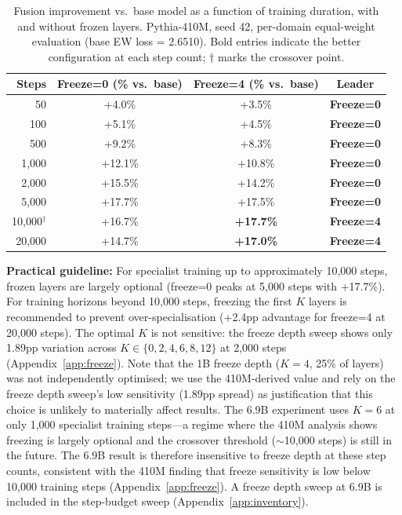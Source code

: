 \documentclass{article}
\begin{document}
\begin{table}[h]
\centering
\caption{Fusion improvement vs.\ base model as a function of training duration, with and without frozen layers. Pythia-410M, seed 42, per-domain equal-weight evaluation (base EW loss = 2.6510). Bold entries indicate the better configuration at each step count; $\dagger$ marks the crossover point.}
\label{tab:crossover}
\begin{tabular}{rccc}
\toprule
\textbf{Steps} & \textbf{Freeze=0} (\% vs.\ base) & \textbf{Freeze=4} (\% vs.\ base) & \textbf{Leader} \\
\midrule
50    & +4.0\%   & +3.5\%   & \textbf{Freeze=0} \\
100   & +5.1\%   & +4.5\%   & \textbf{Freeze=0} \\
500   & +9.2\%   & +8.3\%   & \textbf{Freeze=0} \\
1,000 & +12.1\%  & +10.8\%  & \textbf{Freeze=0} \\
2,000 & +15.5\%  & +14.2\%  & \textbf{Freeze=0} \\
5,000 & +17.7\%  & +17.5\%  & \textbf{Freeze=0} \\
10,000$^\dagger$ & +16.7\% & \textbf{+17.7\%} & \textbf{Freeze=4} \\
20,000 & +14.7\% & \textbf{+17.0\%} & \textbf{Freeze=4} \\
\bottomrule
\end{tabular}
\end{table}

\textbf{Practical guideline:} For specialist training up to approximately 10,000 steps, frozen layers are largely optional (freeze=0 peaks at 5,000 steps with +17.7\%). For training horizons beyond 10,000 steps, freezing the first $K$ layers is recommended to prevent over-specialisation (+2.4pp advantage for freeze=4 at 20,000 steps). The optimal $K$ is not sensitive: the freeze depth sweep shows only 1.89pp variation across $K \in \{0, 2, 4, 6, 8, 12\}$ at 2,000 steps (Appendix~\ref{app:freeze}). Note that the 1B freeze depth ($K=4$, 25\% of layers) was not independently optimised; we use the 410M-derived value and rely on the freeze depth sweep's low sensitivity (1.89pp spread) as justification that this choice is unlikely to materially affect results. The 6.9B experiment uses $K=6$ at only 1,000 specialist training steps---a regime where the 410M analysis shows freezing is largely optional and the crossover threshold ($\sim$10,000 steps) is still in the future. The 6.9B result is therefore insensitive to freeze depth at these step counts, consistent with the 410M finding that freeze sensitivity is low below 10,000 training steps (Appendix~\ref{app:freeze}). A freeze depth sweep at 6.9B is included in the step-budget sweep (Appendix~\ref{app:inventory}).
\end{document}
